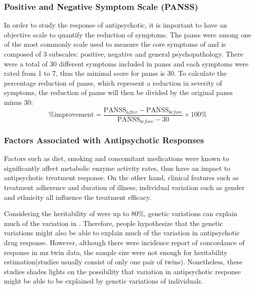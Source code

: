 	\subsubsection{Positive and Negative Symptom Scale (PANSS)}		
	In order to study the response of antipsychotic, it is important to have an objective scale to quantify the reduction of symptoms.
	The \gls{panss}\citep{Kay1987} were among one of the most commonly scale used to measure the core symptoms of  and is composed of 3 subscales: positive, negative and general psychopathology.
	There were a total of 30 different symptoms included in \gls{panss} and each symptoms were rated from 1 to 7, thus the minimal score for \gls{panss} is 30.
	To calculate the percentage reduction of \gls{panss}, which represent a reduction in severity of symptoms, the reduction of \gls{panss} will then be divided by the original \gls{panss} minus 30:
	$$
		\%\text{improvement} = \frac{\text{PANSS}_{after}-\text{PANSS}_{before}}{\text{PANSS}_{before}-30}\times 100\%
	$$
	
	\subsubsection{Factors Associated with Antipsychotic Responses}
	Factors such as diet, smoking and concomitant medications were known to significantly affect metabolic enzyme activity rates, thus have an impact to antipsychotic treatment response\citep{Arranz2011}.
	On the other hand, clinical features such as treatment adherence and duration of illness; individual variation such as gender and ethnicity all influence the treatment efficacy\citep{Arranz2011}.
	 
	Considering the heritability of  were up to 80\%, genetic variations can explain much of the variation in . 
	Therefore, people hypothesize that the genetic variations might also be able to explain much of the variation in antipsychotic drug response.
	However, although there were incidence report of concordance of response in \gls{mz} twin data\citep{Vojvoda1996,Mata2001}, the sample size were not enough for heritability estimation(studies usually consist of only one pair of twins).
	Nonetheless, these studies shades lights on the possibility that variation in antipsychotic response might be able to be explained by genetic variations of individuals.
	

